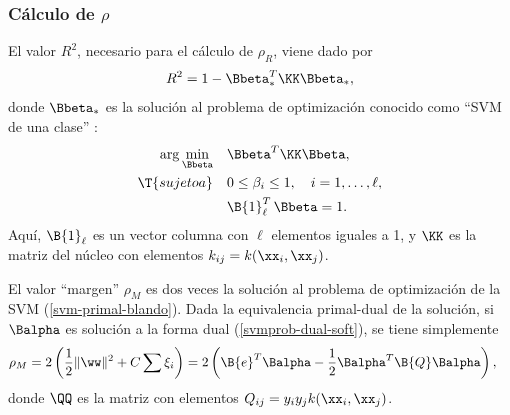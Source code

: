 %
\subsubsection{Cálculo de $\rho$}
%
El valor $R^2$, necesario para el cálculo de $\rho_R$, viene dado por
%
\begin{align}
  R^2 = 1 - \Bbeta_*^T \KK \Bbeta_*,
\end{align}
%
donde $\Bbeta_*$ es la solución al problema de optimización conocido
como ``SVM de una clase'' \cite{scholkopf}:
%
\begin{align}
\begin{split}
  \arg\min_{\Bbeta}\quad&\Bbeta^T \KK \Bbeta,\\
  \T{sujeto a}    \quad&0\leq\beta_i\leq{}1,\quad{}i=1,\ldots,\ell,\\
                       &\B{1}^T_\ell\,\Bbeta=1.
  \end{split}
  \label{svm-oneclass}
\end{align}
%
Aquí, $\B{1}_{\ell}$ es un vector columna con $\ell$ elementos iguales
a 1, y $\KK$ es la matriz del núcleo con elementos
$k_{ij}=k(\xx_i,\xx_j)$.

El valor ``margen'' $\rho_M$ es dos veces la solución al problema de
optimización de la SVM (\autoref{svm-primal-blando}).  Dada la
equivalencia primal-dual de la solución, si $\Balpha$ es solución a
la forma dual (\autoref{svmprob-dual-soft}), se tiene simplemente
%
\begin{align}
\label{prieqdual}
  \rho_M &= 2\left(\frac{1}{2}\|\ww\|^2+C\sum\xi_i \right)
  =2\left(\B{e}^T\Balpha-\frac{1}{2}\Balpha^T\B{Q}\Balpha\right),
\end{align}
%
donde $\QQ$ es la matriz con elementos $Q_{ij}=y_iy_jk(\xx_i,\xx_j)$.
